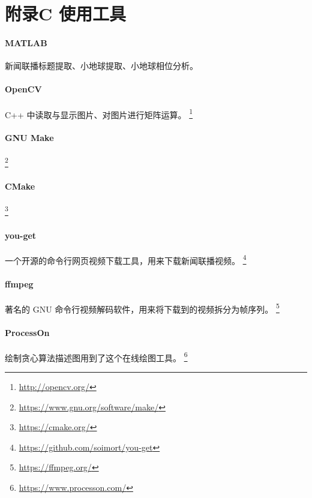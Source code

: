 \documentclass[a4paper, fontset=none]{article}
\begin{document}
\section*{附录C 使用工具}
\label{sec:使用工具}

\paragraph{MATLAB}
\label{par:MATLAB}
新闻联播标题提取、小地球提取、小地球相位分析。

\paragraph{OpenCV}
\label{par:OpenCV}
C++ 中读取与显示图片、对图片进行矩阵运算。
\footnote{\url{http://opencv.org/}}

\paragraph{GNU Make}
\label{par:GNU Make}
\footnote{\url{https://www.gnu.org/software/make/}}

\paragraph{CMake}
\label{par:CMake}
\footnote{\url{https://cmake.org/}}

\paragraph{you-get}
\label{par:you-get}
一个开源的命令行网页视频下载工具，用来下载新闻联播视频。
\footnote{\url{https://github.com/soimort/you-get}}

\paragraph{ffmpeg}
\label{par:ffmpeg}
著名的 GNU 命令行视频解码软件，用来将下载到的视频拆分为帧序列。
\footnote{\url{https://ffmpeg.org/}}

\paragraph{ProcessOn}
\label{par:ProcessOn}
绘制贪心算法描述图用到了这个在线绘图工具。
\footnote{\url{https://www.processon.com/}}
\end{document}
